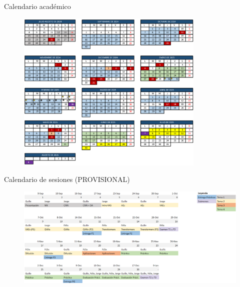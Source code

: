 \begin{frame}{Calendario académico}
\begin{figure}
    \centering
    \includegraphics[width=0.8\textwidth]{Slides/figures/Presentacion/Calendario_Academico.png}
\end{figure}
\end{frame}

\begin{frame}{Calendario de sesiones (PROVISIONAL)}
\begin{figure}
    \centering
    \includegraphics[width=\textwidth]{Slides/figures/Presentacion/Sesiones.png}
\end{figure}
\end{frame}

